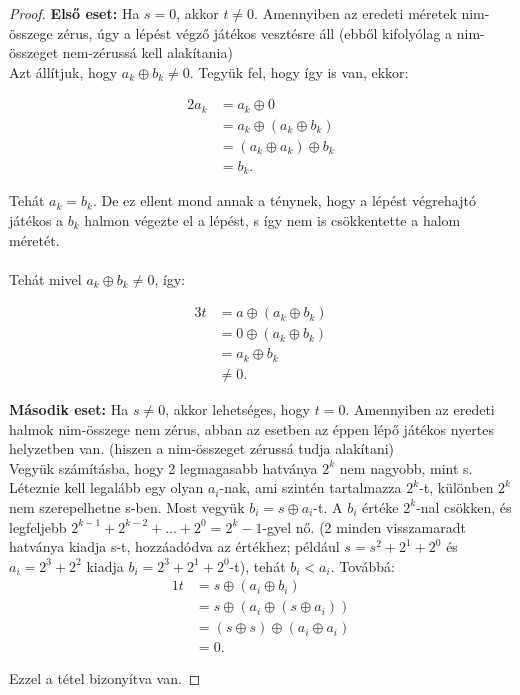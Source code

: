 \begin{proof}
\textbf{Első eset:} Ha $s = 0$, akkor $t \neq 0$. Amennyiben az eredeti méretek nim-összege zérus, úgy a lépést végző játékos vesztésre áll (ebből kifolyólag a nim-összeget nem-zérussá kell alakítania)\\
Azt állítjuk, hogy $a_k \oplus b_k \neq 0$. Tegyük fel, hogy így is van, ekkor:

\begin{alignat*}{2}
	a_k &= a_k \oplus 0 \\
	&= a_k \oplus (a_k \oplus b_k) \\
	&= (a_k \oplus a_k) \oplus b_k \\
	&= b_k.
\end{alignat*}

Tehát $a_k = b_k$. De ez ellent mond annak a ténynek, hogy a lépést végrehajtó játékos a $b_k$ halmon végezte el a lépést, s így nem is csökkentette a halom méretét. \\ \\
Tehát mivel $a_k \oplus b_k \neq 0$, így:

\begin{alignat*}{3}
	t &= a \oplus (a_k \oplus b_k) \\
	&= 0 \oplus (a_k \oplus b_k) \\
	&= a_k \oplus b_k \\
	&\neq 0.
\end{alignat*}

\textbf{Második eset:} Ha $s \neq 0$, akkor lehetséges, hogy $t = 0$. Amennyiben  az eredeti halmok nim-összege nem zérus, abban az esetben az éppen lépő játékos nyertes helyzetben van. (hiszen a nim-összeget zérussá tudja alakítani) \\

Vegyük számításba, hogy 2 legmagasabb hatványa $2^k$ nem nagyobb, mint s. Léteznie kell legalább egy olyan $a_i$-nak, ami szintén tartalmazza $2^k$-t, különben $2^k$ nem szerepelhetne s-ben. Most vegyük $b_i = s \oplus a_i$-t. A $b_i$ értéke $2^k$-nal csökken, és legfeljebb $2^{k-1} + 2^{k-2} + ... + 2^0 = 2^k -1 $-gyel nő. (2 minden visszamaradt hatványa kiadja s-t, hozzáadódva az értékhez; például $s = s^2 + 2^1 + 2^0$ és $a_i = 2^3 + 2^2$ kiadja $b_i = 2^3 + 2^1 + 2^0$-t), tehát $b_i < a_i$. Továbbá:
\begin{alignat*}{1}
	t &= s \oplus (a_i \oplus b_i) \\
	&= s \oplus (a_i \oplus (s \oplus a_i)) \\
	&= (s \oplus s) \oplus (a_i \oplus a_i) \\
	&= 0.
\end{alignat*}

Ezzel a tétel bizonyítva van.
\end{proof}

